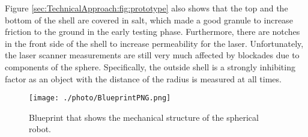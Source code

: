 Figure \ref{sec:TechnicalApproach:fig:prototype} also shows that the top and the bottom of the shell are covered in salt, which made a good granule to increase friction to the ground in the early testing phase. Furthermore, there are notches in the front side of the shell to increase permeability for the laser. Unfortunately, the laser scanner measurements are still very much affected by blockades due to components of the sphere. Specifically, the outside shell is a strongly inhibiting factor as an object with the distance of the radius is measured at all times.
                                                                                                                                                                                                                  
\begin{figure}                                                                                                                                                                                                    
\centering                                                                                                                                                                                                        
\texttt{[image: ./photo/BlueprintPNG.png]}                                                                                                                                                      
\caption{Blueprint that shows the mechanical structure of the spherical robot.}                                                                                                                                   
\label{sec:TechnicalApproach:fig:blueprint}                                                                                                                                                                       
\end{figure}                                                                                                                                                                                                      
                                                                                                                                                                                                                  

